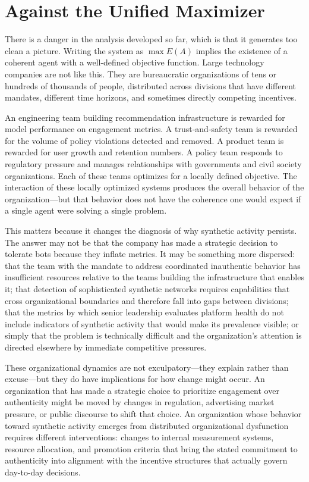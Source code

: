 \documentclass[12pt,a4paper]{article}
\begin{document}
\section{Against the Unified Maximizer}

There is a danger in the analysis developed so far, which is that it generates too clean a
picture. Writing the system as $\max E(A)$ implies the existence of a coherent agent with a
well-defined objective function. Large technology companies are not like this. They are
bureaucratic organizations of tens or hundreds of thousands of people, distributed across
divisions that have different mandates, different time horizons, and sometimes directly
competing incentives.

An engineering team building recommendation infrastructure is rewarded for model performance
on engagement metrics. A trust-and-safety team is rewarded for the volume of policy violations
detected and removed. A product team is rewarded for user growth and retention numbers. A policy
team responds to regulatory pressure and manages relationships with governments and civil society
organizations. Each of these teams optimizes for a locally defined objective. The interaction
of these locally optimized systems produces the overall behavior of the organization---but that
behavior does not have the coherence one would expect if a single agent were solving a single
problem.

This matters because it changes the diagnosis of why synthetic activity persists. The answer
may not be that the company has made a strategic decision to tolerate bots because they inflate
metrics. It may be something more dispersed: that the team with the mandate to address
coordinated inauthentic behavior has insufficient resources relative to the teams building the
infrastructure that enables it; that detection of sophisticated synthetic networks requires
capabilities that cross organizational boundaries and therefore fall into gaps between divisions;
that the metrics by which senior leadership evaluates platform health do not include indicators
of synthetic activity that would make its prevalence visible; or simply that the problem is
technically difficult and the organization's attention is directed elsewhere by immediate
competitive pressures.

These organizational dynamics are not exculpatory---they explain rather than excuse---but they
do have implications for how change might occur. An organization that has made a strategic choice
to prioritize engagement over authenticity might be moved by changes in regulation, advertising
market pressure, or public discourse to shift that choice. An organization whose behavior toward
synthetic activity emerges from distributed organizational dysfunction requires different
interventions: changes to internal measurement systems, resource allocation, and promotion
criteria that bring the stated commitment to authenticity into alignment with the incentive
structures that actually govern day-to-day decisions.
\end{document}
